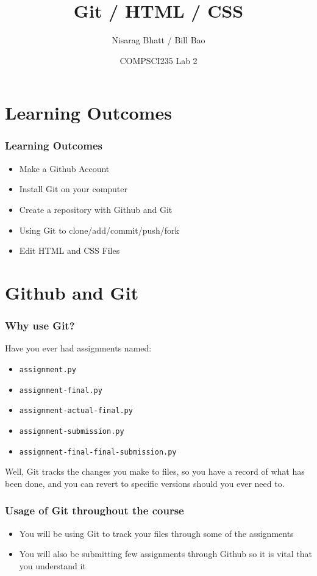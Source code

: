 \documentclass{beamer}
\title[COMPSCI 235 Lab 2 (2020)]
{Git / HTML / CSS}
\author{Nisarag Bhatt / Bill Bao}
\date[Auguest 2020]{COMPSCI235 Lab 2}
\begin{document}

\frame{\titlepage}


\section{Learning Outcomes}
\begin{frame}
  \frametitle{Learning Outcomes}
  \begin{itemize}
  	\item Make a Github Account
    \item Install Git on your computer
    \item Create a repository with Github and Git
    \item Using Git to clone/add/commit/push/fork
    \item Edit HTML and CSS Files
    \end{itemize}
\end{frame}



\section{Github and Git}

\begin{frame}
  \frametitle{Why use Git?}
  
  Have you ever had assignments named:
  
  \begin{itemize}
  	\item \texttt{assignment.py}
  	\item \texttt{assignment-final.py}
  	\item \texttt{assignment-actual-final.py}
  	\item \texttt{assignment-submission.py}
  	\item \texttt{assignment-final-final-submission.py}
  \end{itemize}
  
  \pause 
  
  Well, Git tracks the changes you make to files, so you have a record of what has been done, and you can revert to specific versions should you ever need to. 
\end{frame}

\begin{frame}
  \frametitle{Usage of Git throughout the course}
  
  \begin{itemize}
  	\item You will be using Git to track your files through some of the assignments
  	\item You will also be submitting few assignments through Github so it is vital that you understand it 
  \end{itemize}
  
  
  
\end{frame}
\end{document}
